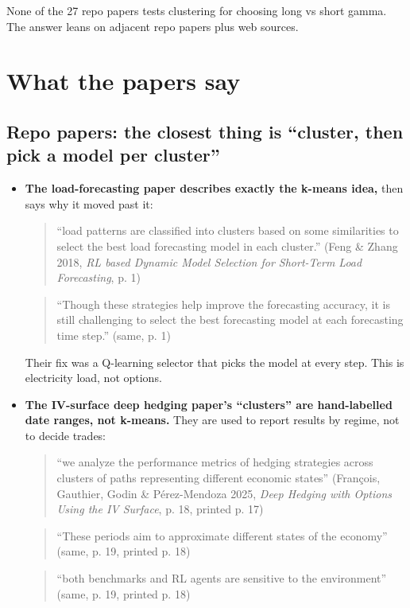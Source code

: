 \documentclass{article}
\begin{document}
None of the 27 repo papers tests clustering for choosing long vs short gamma. The answer leans on adjacent repo papers plus web sources.

\section{What the papers say}

\subsection{Repo papers: the closest thing is ``cluster, then pick a model per cluster''}

\begin{itemize}

\item \textbf{The load-forecasting paper describes exactly the k-means idea,} then says why it moved past it:

\begin{quote}``load patterns are classified into clusters based on some similarities to select the best load forecasting model in each cluster.'' (Feng \& Zhang 2018, \emph{RL based Dynamic Model Selection for Short-Term Load Forecasting}, p. 1)\end{quote}

\begin{quote}``Though these strategies help improve the forecasting accuracy, it is still challenging to select the best forecasting model at each forecasting time step.'' (same, p. 1)\end{quote}

Their fix was a Q-learning selector that picks the model at every step. This is electricity load, not options.

\item \textbf{The IV-surface deep hedging paper's ``clusters'' are hand-labelled date ranges, not k-means.} They are used to report results by regime, not to decide trades:

\begin{quote}``we analyze the performance metrics of hedging strategies across clusters of paths representing different economic states'' (François, Gauthier, Godin \& Pérez-Mendoza 2025, \emph{Deep Hedging with Options Using the IV Surface}, p. 18, printed p. 17)\end{quote}

\begin{quote}``These periods aim to approximate different states of the economy'' (same, p. 19, printed p. 18)\end{quote}

\begin{quote}``both benchmarks and RL agents are sensitive to the environment'' (same, p. 19, printed p. 18)\end{quote}

\end{itemize}
\end{document}
